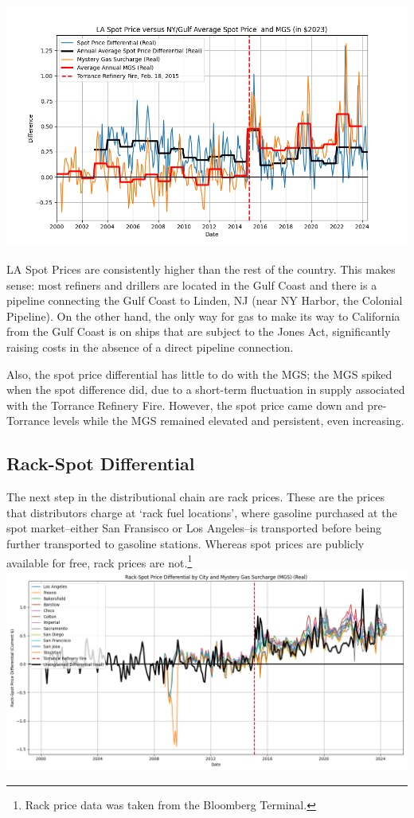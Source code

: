 \documentclass{article}
\begin{document}
\centering \includegraphics[width=5.5in]{spot_differential.png} \\
\raggedright LA Spot Prices are consistently higher than the rest of the country. This makes sense: most refiners and drillers are located in the Gulf Coast and there is a pipeline connecting the Gulf Coast to Linden, NJ (near NY Harbor, the Colonial Pipeline). On the other hand, the only way for gas to make its way to California from the Gulf Coast is on ships that are subject to the Jones Act, significantly raising costs in the absence of a direct pipeline connection. 

Also, the spot price differential has little to do with the MGS; the MGS spiked when the spot difference did, due to a short-term fluctuation in supply associated with the Torrance Refinery Fire. However, the spot price came down and pre-Torrance levels while the MGS remained elevated and persistent, even increasing.

\subsection{Rack-Spot Differential}
The next step in the distributional chain are rack prices. These are the prices that distributors charge at `rack fuel locations', where gasoline purchased at the spot market--either San Fransisco or Los Angeles--is transported before being further transported to gasoline stations. Whereas spot prices are publicly available for free, rack prices are not.\footnote{Rack price data was taken from the Bloomberg Terminal.} \\
\centering \includegraphics[width=5.5in]{rack_spot_differentials.png}
\end{document}
